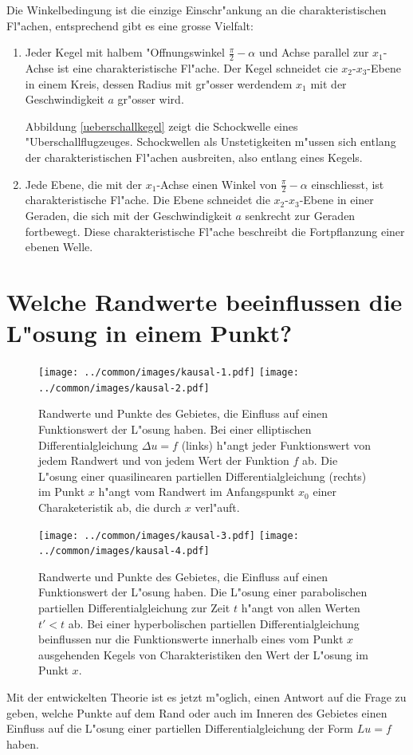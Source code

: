 Die Winkelbedingung ist die einzige Einschr"ankung an
die charakteristischen Fl"achen,  entsprechend gibt es eine
grosse Vielfalt:
\begin{enumerate}
\item
Jeder Kegel mit halbem "Offnungswinkel $\frac{\pi}2-\alpha$
und Achse parallel zur $x_1$-Achse ist eine charakteristische Fl"ache.
Der Kegel schneidet cie $x_2$-$x_3$-Ebene in einem Kreis, dessen Radius mit
gr"osser werdendem $x_1$ mit der Geschwindigkeit $a$ gr"osser wird.

Abbildung \ref{ueberschallkegel}
zeigt die Schockwelle eines "Uberschallflugzeuges. Schockwellen
als Unstetigkeiten m"ussen sich entlang der charakteristischen Fl"achen ausbreiten,
also entlang eines Kegels.
\item 
Jede Ebene, die mit der $x_1$-Achse einen Winkel von $\frac\pi2-\alpha$
einschliesst, ist charakteristische Fl"ache.
Die Ebene schneidet die $x_2$-$x_3$-Ebene in einer Geraden, die sich
mit der Geschwindigkeit $a$ senkrecht zur Geraden fortbewegt.
Diese charakteristische Fl"ache beschreibt die Fortpflanzung einer
ebenen Welle.
\end{enumerate}


\section{Welche Randwerte beeinflussen die L"osung in einem Punkt?}
\begin{figure}
\centering
\texttt{[image: ../common/images/kausal-1.pdf]}\qquad\qquad%
\texttt{[image: ../common/images/kausal-2.pdf]}
\caption{Randwerte und Punkte des Gebietes, die Einfluss auf einen
Funktionswert der L"osung haben.
Bei einer elliptischen Differentialgleichung $\Delta u=f$
(links)
h"angt jeder Funktionswert von jedem Randwert und von jedem Wert der
Funktion $f$ ab.
Die L"osung einer quasilinearen partiellen Differentialgleichung  (rechts)
im Punkt $x$ h"angt vom Randwert im Anfangspunkt $x_0$ einer Charaketeristik
ab, die durch $x$ verl"auft.
\label{einflussmenge1}}
\end{figure}
\begin{figure}
\centering
\texttt{[image: ../common/images/kausal-3.pdf]}\qquad\qquad%
\texttt{[image: ../common/images/kausal-4.pdf]}
\caption{Randwerte und Punkte des Gebietes, die Einfluss auf einen
Funktionswert der L"osung haben.
Die L"osung einer parabolischen partiellen Differentialgleichung
zur Zeit $t$ h"angt von allen Werten $t'<t$ ab.
Bei einer hyperbolischen partiellen Differentialgleichung beinflussen 
nur die Funktionswerte innerhalb eines vom Punkt $x$ ausgehenden Kegels
von Charakteristiken den Wert der L"osung im Punkt $x$.
\label{einflussmenge2}}
\end{figure}
Mit der entwickelten Theorie ist es jetzt m"oglich, einen Antwort auf die
Frage zu geben, welche Punkte auf dem Rand oder auch im Inneren des Gebietes
einen Einfluss auf die L"osung einer partiellen Differentialgleichung
der Form $Lu=f$ haben.

